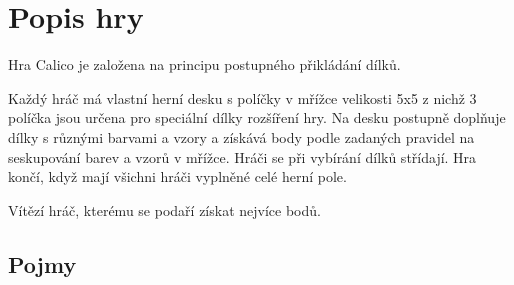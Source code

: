 
\chapter{Popis hry}

Hra Calico je založena na principu postupného přikládání dílků. 

Každý hráč má vlastní herní desku s políčky v mřížce velikosti 5x5 z nichž 3 políčka jsou určena pro speciální dílky rozšíření hry. Na desku postupně doplňuje dílky s různými barvami a vzory a získává body podle zadaných pravidel na seskupování barev a vzorů v mřížce. Hráči se při vybírání dílků střídají. Hra končí, když mají všichni hráči vyplněné celé herní pole.

Vítězí hráč, kterému se podaří získat nejvíce bodů.

\section{Pojmy}


